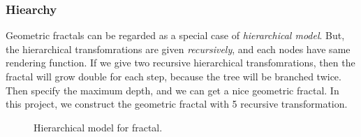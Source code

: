 \documentclass[a4paper]{article}
\begin{document}
\subsubsection{Hiearchy}
Geometric fractals can be regarded as a special case of \textit{hierarchical model}.
But, the hierarchical transfomrations are given \textit{recursively}, and each nodes have same rendering function.
If we give two recursive hierarchical transfomrations, then the fractal will grow double for each step, because the tree will be branched twice.
Then specify the maximum depth, and we can get a nice geometric fractal.
In this project, we construct the geometric fractal with 5 recursive transformation.
\begin{figure}[H]
\centering
{}
\caption[1]{Hierarchical model for fractal.}
\end{figure}
\end{document}
